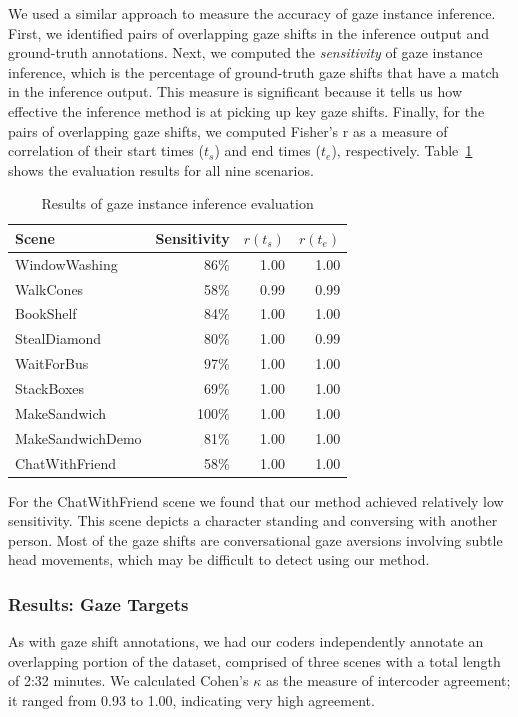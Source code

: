 We used a similar approach to measure the accuracy of gaze instance inference. First, we identified pairs of overlapping gaze shifts in the inference output and ground-truth annotations. Next, we computed the \emph{sensitivity} of gaze instance inference, which is the percentage of ground-truth gaze shifts that have a match in the inference output. This measure is significant because it tells us how effective the inference method is at picking up key gaze shifts. Finally, for the pairs of overlapping gaze shifts, we computed Fisher's r as a measure of correlation of their start times ($t_s$) and end times ($t_e$), respectively. Table~\ref{tab:GazeShiftInferenceResults} shows the evaluation results for all nine scenarios.

\begin{table}
\centering
\def\arraystretch{1.5}
\begin{tabular}{|l|r|r|r|}
\hline
\textbf{Scene} & \textbf{Sensitivity} & $r(t_s)$ & $r(t_e)$ \\
\hline
WindowWashing & 86\% & 1.00 & 1.00 \\
WalkCones & 58\% & 0.99 & 0.99 \\
BookShelf & 84\% & 1.00 & 1.00 \\
StealDiamond & 80\% & 1.00 & 0.99 \\
WaitForBus & 97\% & 1.00 & 1.00 \\
StackBoxes & 69\% & 1.00 & 1.00 \\
MakeSandwich & 100\% & 1.00 & 1.00 \\
MakeSandwichDemo & 81\% & 1.00 & 1.00 \\
ChatWithFriend & 58\% & 1.00 & 1.00 \\
\hline
\end{tabular}
\caption{Results of gaze instance inference evaluation}
\label{tab:GazeShiftInferenceResults}
\end{table}

For the ChatWithFriend scene we found that our method achieved relatively low sensitivity. This scene depicts a character standing and conversing with another person. Most of the gaze shifts are conversational gaze aversions involving subtle head movements, which may be difficult to detect using our method.

\subsubsection{Results: Gaze Targets}

As with gaze shift annotations, we had our coders independently annotate an overlapping portion of the dataset, comprised of three scenes with a total length of 2:32 minutes. We calculated Cohen's $\kappa$ as the measure of intercoder agreement; it ranged from 0.93 to 1.00, indicating very high agreement.

